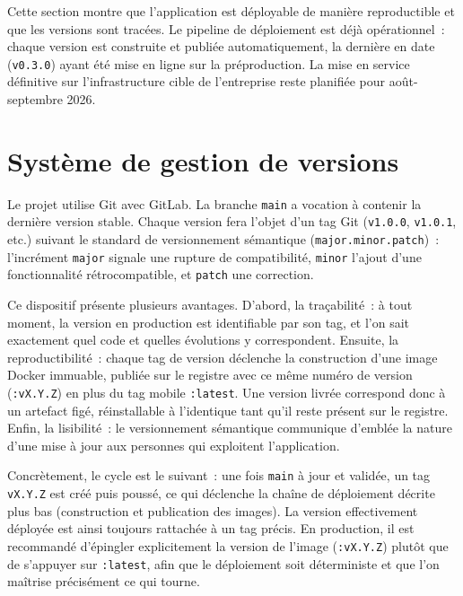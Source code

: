 

Cette section montre que l'application est déployable de manière reproductible et que les versions sont tracées. Le pipeline de déploiement est déjà opérationnel~: chaque version est construite et publiée automatiquement, la dernière en date (\texttt{v0.3.0}) ayant été mise en ligne sur la préproduction. La mise en service définitive sur l'infrastructure cible de l'entreprise reste planifiée pour août-septembre 2026.

\section{Système de gestion de versions}
Le projet utilise Git avec GitLab. La branche \texttt{main} a vocation à contenir la dernière version stable. Chaque version fera l'objet d'un tag Git (\texttt{v1.0.0}, \texttt{v1.0.1}, etc.) suivant le standard de versionnement sémantique (\texttt{major.minor.patch})~: l'incrément \texttt{major} signale une rupture de compatibilité, \texttt{minor} l'ajout d'une fonctionnalité rétrocompatible, et \texttt{patch} une correction.

Ce dispositif présente plusieurs avantages. D'abord, la traçabilité~: à tout moment, la version en production est identifiable par son tag, et l'on sait exactement quel code et quelles évolutions y correspondent. Ensuite, la reproductibilité~: chaque tag de version déclenche la construction d'une image Docker immuable, publiée sur le registre avec ce même numéro de version (\texttt{:vX.Y.Z}) en plus du tag mobile \texttt{:latest}. Une version livrée correspond donc à un artefact figé, réinstallable à l'identique tant qu'il reste présent sur le registre. Enfin, la lisibilité~: le versionnement sémantique communique d'emblée la nature d'une mise à jour aux personnes qui exploitent l'application.

Concrètement, le cycle est le suivant~: une fois \texttt{main} à jour et validée, un tag \texttt{vX.Y.Z} est créé puis poussé, ce qui déclenche la chaîne de déploiement décrite plus bas (construction et publication des images). La version effectivement déployée est ainsi toujours rattachée à un tag précis. En production, il est recommandé d'épingler explicitement la version de l'image (\texttt{:vX.Y.Z}) plutôt que de s'appuyer sur \texttt{:latest}, afin que le déploiement soit déterministe et que l'on maîtrise précisément ce qui tourne.

